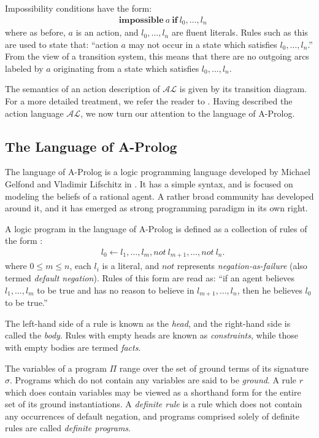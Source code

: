 \documentclass{article}
\newcommand{\AL}{\ensuremath{\mathcal{AL}}}
\newcommand{\impossible}[2]{\ensuremath{\mathbf{impossible} \: #1 \: \mathbf{if} \: #2}}
\begin{document}
Impossibility conditions have the form:
\begin{align*}
    &\impossible{a}{l_{0},\ldots,l_{n}}
\end{align*}
where as before, $a$ is an action, and $l_{0},\ldots,l_{n}$ are fluent literals. Rules such as this are used to state that: ``action $a$ may not occur in a state which satisfies $l_{0},\ldots,l_{n}$.'' From the view of a transition system, this means that there are no outgoing arcs labeled by $a$ originating from a state which satisfies $l_{0},\ldots,l_{n}$.

The semantics of an action description of $\AL$ is given by its transition diagram. For a more detailed treatment, we refer the reader to \cite{Bald2005}. Having described the action language $\AL$, we now turn our attention to the language of A-Prolog.

\subsection{The Language of A-Prolog}

The language of A-Prolog is a logic programming language developed by Michael Gelfond and Vladimir Lifschitz in \cite{GL88}. It has a simple syntax, and is focused on modeling the beliefs of a rational agent. A rather broad community has developed around it, and it has emerged as strong programming paradigm in its own right.

A logic program in the language of A-Prolog is defined as a collection of rules of the form \cite{GL88,Baral03}:
\begin{align*}
    &l_{0} \leftarrow l_{1},\ldots,l_{m}, not \: l_{m+1}, \ldots, not \: l_{n}.
\end{align*}
where $0 \leq m \leq n$, each $l_{i}$ is a literal, and $not$ represents \emph{negation-as-failure} (also termed \emph{default negation}). Rules of this form are read as: ``if an agent believes $l_{1},\ldots,l_{m}$ to be true and has no reason to believe in $l_{m+1},\ldots,l_{n}$, then he believes $l_{0}$ to be true.''

The left-hand side of a rule is known as the \emph{head}, and the right-hand side is called the \emph{body}. Rules with empty heads are known as \emph{constraints}, while those with empty bodies are termed \emph{facts}.

The variables of a program $\Pi$ range over the set of ground terms of its signature $\sigma$. Programs which do not contain any variables are said to be \emph{ground}. A rule $r$ which does contain variables may be viewed as a shorthand form for the entire set of its ground instantiations. A \emph{definite rule} is a rule which does not contain any occurrences of default negation, and programs comprised solely of definite rules are called \emph{definite programs}.
\end{document}
